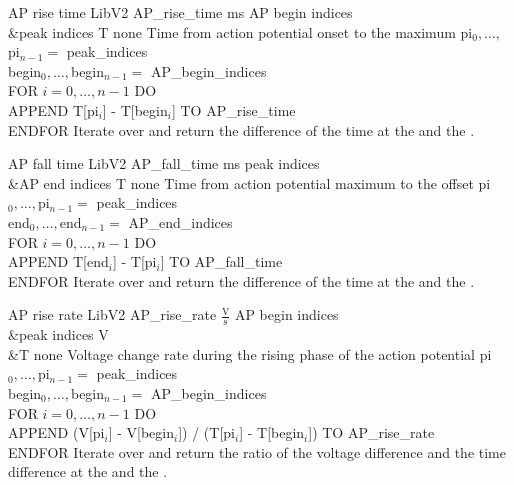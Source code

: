 \begin{efeature}
  {AP rise time}
  {LibV2}
  {AP\_rise\_time}
  {ms}
  {AP begin indices\\&peak indices}
  {T}
  {none}
  {Time from action potential onset to the maximum}
  {
  pi$_0, \ldots, $pi$_{n-1} =$ peak\_indices \\
  begin$_0, \ldots, $begin$_{n-1} =$ AP\_begin\_indices \\
  FOR $i = 0, \dots, n - 1$ DO \+ \\
    APPEND T[pi$_i$] - T[begin$_i$] TO AP\_rise\_time \- \\
  ENDFOR
  }
  Iterate over  and return the difference of the time at the  and the .
  
\end{efeature}

\begin{efeature}
  {AP fall time}
  {LibV2}
  {AP\_fall\_time}
  {ms}
  {peak indices\\&AP end indices}
  {T}
  {none}
  {Time from action potential maximum to the offset}
  {
  pi$_0, \ldots, $pi$_{n-1} =$ peak\_indices \\
  end$_0, \ldots, $end$_{n-1} =$ AP\_end\_indices \\
  FOR $i = 0, \dots, n - 1$ DO \+ \\
    APPEND T[end$_i$] - T[pi$_i$] TO AP\_fall\_time \- \\
  ENDFOR
  }
  Iterate over  and return the difference of the time at the  and the .
  
\end{efeature}

\begin{efeature}
  {AP rise rate}
  {LibV2}
  {AP\_rise\_rate}
  {$\frac{\mathrm{V}}{\mathrm{s}}$}
  {AP begin indices\\&peak indices}
  {V\\&T}
  {none}
  {Voltage change rate during the rising phase of the action potential}
  {
  pi$_0, \ldots, $pi$_{n-1} =$ peak\_indices \\
  begin$_0, \ldots, $begin$_{n-1} =$ AP\_begin\_indices \\
  FOR $i = 0, \dots, n - 1$ DO \+ \\
    APPEND (V[pi$_i$] - V[begin$_i$]) / (T[pi$_i$] - T[begin$_i$]) TO AP\_rise\_rate \- \\
  ENDFOR
  }
  Iterate over  and return the ratio of the voltage difference and the time difference at the  and the .
  
\end{efeature}

